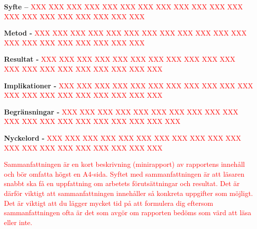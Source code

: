 \noindent\textbf{Syfte –} \textcolor{red}{XXX XXX XXX XXX XXX XXX XXX XXX XXX XXX XXX XXX XXX XXX XXX XXX XXX XXX XXX XXX}

\noindent\textbf{Metod -} \textcolor{red}{XXX XXX XXX XXX XXX XXX XXX XXX XXX XXX XXX XXX XXX XXX XXX XXX XXX XXX XXX XXX}

\noindent\textbf{Resultat -} \textcolor{red}{XXX XXX XXX XXX XXX XXX XXX XXX XXX XXX XXX XXX XXX XXX XXX XXX XXX XXX XXX XXX}

\noindent\textbf{Implikationer -} \textcolor{red}{XXX XXX XXX XXX XXX XXX XXX XXX XXX XXX XXX XXX XXX XXX XXX XXX XXX XXX XXX XXX}

\noindent\textbf{Begränsningar -} \textcolor{red}{XXX XXX XXX XXX XXX XXX XXX XXX XXX XXX XXX XXX XXX XXX XXX XXX XXX XXX XXX XXX}

\noindent\textbf{Nyckelord -} \textcolor{red}{XXX XXX XXX XXX XXX XXX XXX XXX XXX XXX XXX XXX XXX XXX XXX XXX XXX XXX XXX XXX}

\textcolor{red}{Sammanfattningen är en kort beskrivning (minirapport) av rapportens innehåll och bör omfatta högst en A4-sida. Syftet med sammanfattningen är att läsaren snabbt ska få en uppfattning om arbetets förutsättningar och resultat. Det är därför viktigt att sammanfattningen innehåller så konkreta uppgifter som möjligt. Det är viktigt att du lägger mycket tid på att formulera dig eftersom sammanfattningen ofta är det som avgör om rapporten bedöms som värd att läsa eller inte.}
